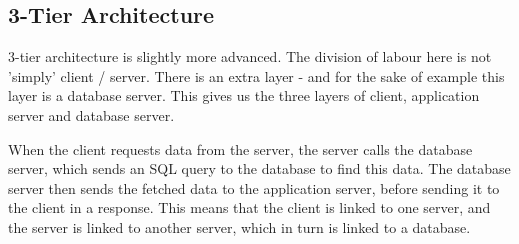 \subsection{3-Tier Architecture}

3-tier architecture is slightly more advanced. The division of labour here is not 'simply' 
client / server. There is an extra layer - and for the sake of example this layer is a 
database server. This gives us the three layers of client, application server and database 
server. 


When the client requests data from the server, the server calls the database server, which 
sends an SQL query to the database to find this data. The database server then sends the 
fetched data to the application server, before sending it to the client in a response. This 
means that the client is linked to one server, and the server is linked to another server, 
which in turn is linked to a database\cite{tierserverclient08}.